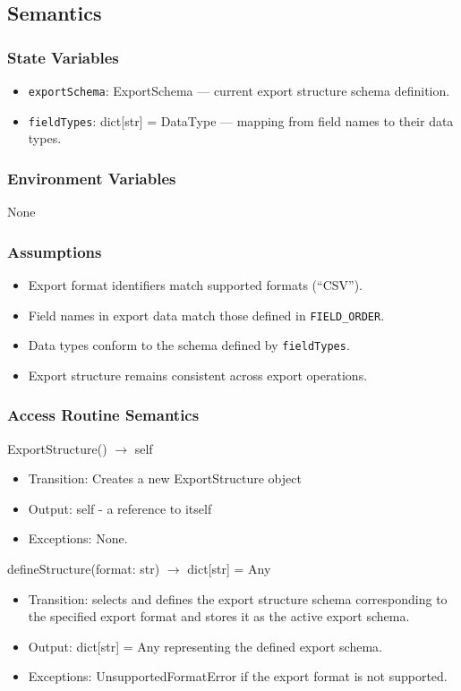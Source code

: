 \documentclass[12pt, titlepage]{article}
\begin{document}
\subsection{Semantics}

\subsubsection{State Variables}
\begin{itemize}
  \item \texttt{exportSchema}: ExportSchema — current export structure schema definition.
  \item \texttt{fieldTypes}: dict[str] = DataType — mapping from field names to their data types.
\end{itemize}

\subsubsection{Environment Variables}
None

\subsubsection{Assumptions}
\begin{itemize}
  \item Export format identifiers match supported formats (``CSV'').
  \item Field names in export data match those defined in \texttt{FIELD\_ORDER}.
  \item Data types conform to the schema defined by \texttt{fieldTypes}.
  \item Export structure remains consistent across export operations.
\end{itemize}

\subsubsection{Access Routine Semantics}

ExportStructure() $\rightarrow$ self
\begin{itemize}
  \item Transition: Creates a new ExportStructure object
  \item Output: self - a reference to itself
  \item Exceptions: None.
\end{itemize}

defineStructure(format: str) $\rightarrow$ dict[str] = Any
\begin{itemize}
  \item Transition: selects and defines the export structure schema corresponding to the specified export format and stores it as the active export schema.
  \item Output: dict[str] = Any representing the defined export schema.
  \item Exceptions: UnsupportedFormatError if the export format is not supported.
\end{itemize}
\end{document}
